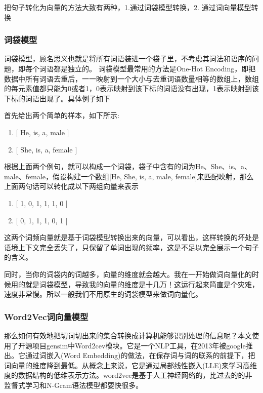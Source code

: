 把句子转化为向量的方法大致有两种，1.通过词袋模型转换，2. 通过词向量模型转换


\subsubsection{词袋模型}
词袋模型，顾名思义也就是将所有词语装进一个袋子里，不考虑其词法和语序的问题，即每个词语都是独立的。
词袋模型最常用的方法是One-Hot Encoding，即把数据中所有词语去重后，一一映射到一个大小与去重词语数量相等的数组上，数组的每元素值都只能为0或者1，0表示映射到该下标的词语没有出现，1表示映射到该下标的词语出现了。具体例子如下

\newpage
首先给出两个简单的样本，如下所示: 

\begin{enumerate}
	\item $[$ He, is, a, male $]$
	\item $[$ She, is, a, female $]$
\end{enumerate}

根据上面两个例句，就可以构成一个词袋，袋子中含有的词为He、She、is、a、male、female，假设构建一个数组[He, She, is, a, male, female]来匹配映射，那么上面两句话可以转化成以下两组向量来表示

\begin{enumerate}
	\item $[$ 1, 0, 1, 1, 1, 0 $]$
	\item $[$ 0, 1, 1, 1, 0, 1 $]$
\end{enumerate}
	
这两个词频向量就是基于词袋模型转换出来的向量，可以看出，这样转换的坏处是语境上下文完全丢失了，只保留了单词出现的频率，这是不足以完全展示一个句子的含义。

同时，当你的词袋内的词越多，向量的维度就会越大。我在一开始做词向量化的时候用的就是词袋模型，导致我的向量的维度是十几万！这运行起来简直是个灾难，速度非常慢。所以一般我们不用原生的词袋模型来做词向量化。

\subsubsection{Word2Vec词向量模型}
那么如何有效地把切词切出来的集合转换成计算机能够识别处理的信息呢？本文使用了开源项目gensim中Word2cev模块。它是一个NLP工具，在2013年被google推出。它通过词嵌入(Word Embedding)的做法，在保存词与词的联系的前提下，把词向量的维度降到最低。从概念上来说，它是通过局部线性嵌入(LLE)来学习高维度的数据结构的低维表示方法。word2vec是基于人工神经网络的，比过去的的非监督式学习和N-Gram语法模型都要快很多。

